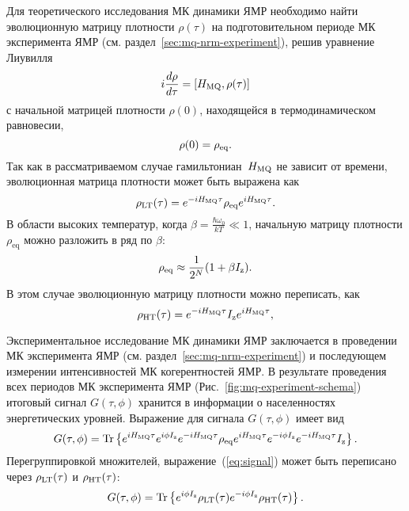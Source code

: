 Для теоретического исследования МК динамики ЯМР
необходимо найти эволюционную матрицу плотности $\rho(\tau)$
на подготовительном периоде МК эксперимента ЯМР (см. раздел~\ref{sec:mq-nrm-experiment}),
решив уравнение Лиувилля~\cite{Feldman2012}
%
\begin{equation}\label{eq:liouvile}
  i \frac{d \rho}{d \tau} = \left[H_\mathrm{MQ}, \rho(\tau)\right]
\end{equation}
%
с начальной матрицей плотности $\rho(0)$,
находящейся в термодинамическом равновесии,
%
\begin{equation}\label{eq:rho_init}
    \rho(0) = \rho_\mathrm{eq}.
\end{equation}
%
Так как в рассматриваемом случае гамильтониан~$H_\mathrm{MQ}$
не зависит от времени,
эволюционная матрица плотности может быть выражена как
\begin{equation}\label{eq:rho_eval_lt}
  \rho_\mathrm{LT} (\tau) = e^{-iH_\mathrm{MQ}\tau} \rho_\mathrm{eq} e^{iH_\mathrm{MQ}\tau}.
\end{equation}
В области высоких температур,
когда $\beta = \frac{\hbar\omega_{0}}{kT} \ll 1$,
начальную матрицу плотности $\rho_{\mathrm{eq}}$ можно разложить в ряд по $\beta$:
%
\begin{equation}
  \label{eq:rho_ht}
  \rho_{\mathrm{eq}} \approx \dfrac{1}{2^N} (1 + \beta I_\mathrm{z}).
\end{equation}
%
В этом случае эволюционную матрицу плотности можно переписать, как
\begin{equation}\label{eq:rho_eval_ht}
  \rho_\mathrm{HT} (\tau) =  e^{-iH_\mathrm{MQ}\tau} I_\mathrm{z} e^{iH_\mathrm{MQ}\tau},
\end{equation}

Экспериментальное исследование МК динамики ЯМР заключается в проведении
МК эксперимента ЯМР (см. раздел~\ref{sec:mq-nrm-experiment})
и последующем измерении интенсивностей МК когерентностей ЯМР.
В результате проведения всех периодов МК эксперимента ЯМР (Рис.~\ref{fig:mq-experiment-schema})
итоговый сигнал $G(\tau, \phi)$ хранится в информации о населенностях энергетических уровней\cite{Feldman1997}.
Выражение для сигнала $G(\tau, \phi)$ имеет вид
%
\begin{equation}
  \label{eq:signal}
   G(\tau, \phi)
   = \mathrm{Tr} \left\{ 
     e^{iH_\mathrm{MQ}\tau} e^{i\phi I_\mathrm{z}} e^{-iH_\mathrm{MQ}\tau}
     \rho_\mathrm{eq}
     e^{iH_\mathrm{MQ}\tau} e^{-i\phi I_\mathrm{z}} e^{-iH_\mathrm{MQ}\tau}
     I_\mathrm{z}
     \right\}.
\end{equation}
%
Перегруппировкой множителей,
выражение~(\ref{eq:signal}) может быть переписано через
 $\rho_\mathrm{LT}(\tau)$ и $\rho_\mathrm{HT}(\tau)$:
%
\begin{equation}
  \label{eq:signal-short}
  G(\tau, \phi) = \mathrm{Tr} \left\{ 
   e^{i\phi I_\mathrm{z}} \rho_\mathrm{LT} (\tau)
   e^{-i\phi I_\mathrm{z}} \rho_\mathrm{HT} (\tau)
   \right\}.
\end{equation}


